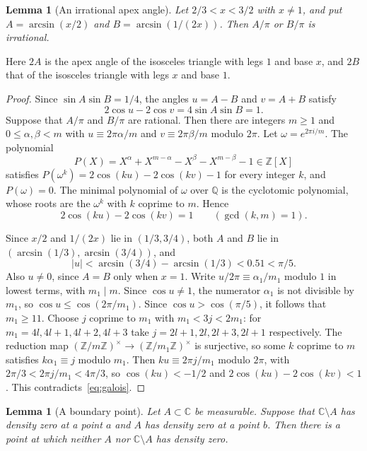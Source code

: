 \documentclass[10pt]{article}
\newtheorem{lem}[thm]{Lemma}
\theoremstyle{remark}
\newcommand{\C}{\mathbb C}
\newcommand{\Q}{\mathbb Q}
\newcommand{\Z}{\mathbb Z}
\begin{document}
\begin{lem}[An irrational apex angle]\label{lem:cyclotomic}
Let $2/3<x<3/2$ with $x\ne1$, and put $A=\arcsin(x/2)$ and $B=\arcsin(1/(2x))$. Then $A/\pi$ or $B/\pi$ is irrational.
\end{lem}

Here $2A$ is the apex angle of the isosceles triangle with legs $1$ and base $x$, and $2B$ that of the isosceles triangle with legs $x$ and base $1$.

\begin{proof}
Since $\sin A\sin B=1/4$, the angles $u=A-B$ and $v=A+B$ satisfy
\[
 2\cos u-2\cos v=4\sin A\sin B=1.
\]
Suppose that $A/\pi$ and $B/\pi$ are rational. Then there are integers $m\ge1$ and $0\le\alpha,\beta<m$ with $u\equiv2\pi\alpha/m$ and $v\equiv2\pi\beta/m$ modulo $2\pi$. Let $\omega=e^{2\pi i/m}$. The polynomial
\[
 P(X)=X^\alpha+X^{m-\alpha}-X^\beta-X^{m-\beta}-1\in\Z[X]
\]
satisfies $P(\omega^k)=2\cos(ku)-2\cos(kv)-1$ for every integer $k$, and $P(\omega)=0$. The minimal polynomial of $\omega$ over $\Q$ is the cyclotomic polynomial, whose roots are the $\omega^k$ with $k$ coprime to $m$. Hence
\begin{equation}\label{eq:galois}
 2\cos(ku)-2\cos(kv)=1\qquad(\gcd(k,m)=1).
\end{equation}

Since $x/2$ and $1/(2x)$ lie in $(1/3,3/4)$, both $A$ and $B$ lie in $(\arcsin(1/3),\arcsin(3/4))$, and
\[
 |u|<\arcsin(3/4)-\arcsin(1/3)<0.51<\pi/5.
\]
Also $u\ne0$, since $A=B$ only when $x=1$. Write $u/2\pi\equiv\alpha_1/m_1$ modulo $1$ in lowest terms, with $m_1\mid m$. Since $\cos u\ne1$, the numerator $\alpha_1$ is not divisible by $m_1$, so $\cos u\le\cos(2\pi/m_1)$. Since $\cos u>\cos(\pi/5)$, it follows that $m_1\ge11$. Choose $j$ coprime to $m_1$ with $m_1<3j<2m_1$: for $m_1=4l,4l+1,4l+2,4l+3$ take $j=2l+1,2l,2l+3,2l+1$ respectively. The reduction map $(\Z/m\Z)^\times\to(\Z/m_1\Z)^\times$ is surjective, so some $k$ coprime to $m$ satisfies $k\alpha_1\equiv j$ modulo $m_1$. Then $ku\equiv2\pi j/m_1$ modulo $2\pi$, with $2\pi/3<2\pi j/m_1<4\pi/3$, so $\cos(ku)<-1/2$ and $2\cos(ku)-2\cos(kv)<1$. This contradicts~\eqref{eq:galois}.
\end{proof}

\begin{lem}[A boundary point]\label{lem:boundarypoint}
Let $A\subset\C$ be measurable. Suppose that $\C\setminus A$ has density zero at a point $a$ and $A$ has density zero at a point $b$. Then there is a point at which neither $A$ nor $\C\setminus A$ has density zero.
\end{lem}
\end{document}
